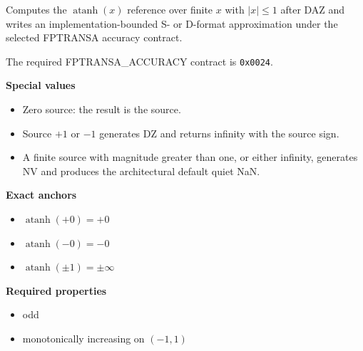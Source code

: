 Computes the $\operatorname{atanh}(x)$ reference over finite $x$ with $|x| \le 1$ after DAZ and writes an implementation-bounded S- or D-format approximation under the selected FPTRANSA accuracy contract.

The required FPTRANSA\_ACCURACY contract is \texttt{0x0024}.

\textbf{Special values}\par
\begin{itemize}
\item Zero source: the result is the source.
\item Source $+1$ or $-1$ generates DZ and returns infinity with the source sign.
\item A finite source with magnitude greater than one, or either infinity, generates NV and produces the architectural default quiet NaN.
\end{itemize}

\textbf{Exact anchors}\par
\begin{itemize}
\item $\operatorname{atanh}(+0) = +0$
\item $\operatorname{atanh}(-0) = -0$
\item $\operatorname{atanh}(\mathord{\pm}1) = \mathord{\pm}\infty$
\end{itemize}

\textbf{Required properties}\par
\begin{itemize}
\item odd
\item monotonically increasing on $(-1, 1)$
\end{itemize}
